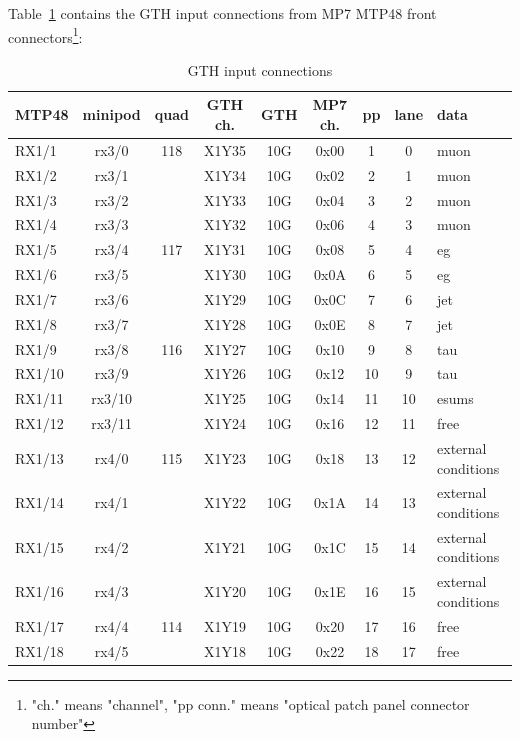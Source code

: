 Table~\ref{tab:app:gth_i_conn} contains the GTH input connections from MP7 MTP48 front connectors\footnote{"ch." means "channel", "pp conn." means "optical patch panel connector number"}:

\begin{longtable}{|l|c|c|c|c|c|c|c|l|}
\caption{GTH input connections}
    \label{tab:app:gth_i_conn}\\
\hline
\textbf{MTP48}& \textbf{minipod}& \textbf{quad}& \textbf{GTH ch.}& \textbf{GTH}& \textbf{MP7 ch.} &\textbf{pp}& \textbf{lane}& \textbf{data}\\
\hline
\hline
\endhead
RX1/1  & rx3/0  & 118 & X1Y35 & 10G & 0x00 & 1  & 0  & muon\\\hline
RX1/2  & rx3/1  &     & X1Y34 & 10G & 0x02 & 2  & 1  & muon\\\hline
RX1/3  & rx3/2  &     & X1Y33 & 10G & 0x04 & 3  & 2  & muon\\\hline
RX1/4  & rx3/3  &     & X1Y32 & 10G & 0x06 & 4  & 3  & muon\\\hline
RX1/5  & rx3/4  & 117 & X1Y31 & 10G & 0x08 & 5  & 4  & eg\\\hline
RX1/6  & rx3/5  &     & X1Y30 & 10G & 0x0A & 6  & 5  & eg\\\hline
RX1/7  & rx3/6  &     & X1Y29 & 10G & 0x0C & 7  & 6  & jet\\\hline
RX1/8  & rx3/7  &     & X1Y28 & 10G & 0x0E & 8  & 7  & jet\\\hline
RX1/9  & rx3/8  & 116 & X1Y27 & 10G & 0x10 & 9  & 8  & tau\\\hline
RX1/10 & rx3/9  &     & X1Y26 & 10G & 0x12 & 10 & 9  & tau\\\hline
RX1/11 & rx3/10 &     & X1Y25 & 10G & 0x14 & 11 & 10 & esums\\\hline
RX1/12 & rx3/11 &     & X1Y24 & 10G & 0x16 & 12 & 11 & free\\\hline
RX1/13 & rx4/0  & 115 & X1Y23 & 10G & 0x18 & 13 & 12 & external conditions\\\hline
RX1/14 & rx4/1  &     & X1Y22 & 10G & 0x1A & 14 & 13 & external conditions\\\hline
RX1/15 & rx4/2  &     & X1Y21 & 10G & 0x1C & 15 & 14 & external conditions\\\hline
RX1/16 & rx4/3  &     & X1Y20 & 10G & 0x1E & 16 & 15 & external conditions\\\hline
RX1/17 & rx4/4  & 114 & X1Y19 & 10G & 0x20 & 17 & 16 & free\\\hline
RX1/18 & rx4/5  &     & X1Y18 & 10G & 0x22 & 18 & 17 & free\\\hline

\end{longtable}
